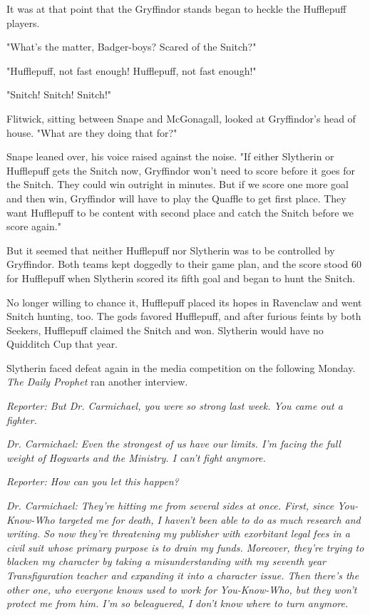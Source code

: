\documentclass[a4paper,11pt]{article}
\begin{document}
It was at that point that the Gryffindor stands began to heckle the Hufflepuff players.

"What's the matter, Badger-boys? Scared of the Snitch?"

"Hufflepuff, not fast enough! Hufflepuff, not fast enough!"

"Snitch! Snitch! Snitch!"

Flitwick, sitting between Snape and McGonagall, looked at Gryffindor's head of house. "What are they doing that for?"

Snape leaned over, his voice raised against the noise. "If either Slytherin or Hufflepuff gets the Snitch now, Gryffindor won't need to score before it goes for the Snitch. They could win outright in minutes. But if we score one more goal and then win, Gryffindor will have to play the Quaffle to get first place. They want Hufflepuff to be content with second place and catch the Snitch before we score again."

But it seemed that neither Hufflepuff nor Slytherin was to be controlled by Gryffindor. Both teams kept doggedly to their game plan, and the score stood 60 for Hufflepuff when Slytherin scored its fifth goal and began to hunt the Snitch.

No longer willing to chance it, Hufflepuff placed its hopes in Ravenclaw and went Snitch hunting, too. The gods favored Hufflepuff, and after furious feints by both Seekers, Hufflepuff claimed the Snitch and won. Slytherin would have no Quidditch Cup that year.

Slytherin faced defeat again in the media competition on the following Monday. \emph{The Daily Prophet} ran another interview.

\emph{Reporter: But Dr. Carmichael, you were so strong last week. You came out a fighter.}

\emph{Dr. Carmichael: Even the strongest of us have our limits. I'm facing the full weight of Hogwarts and the Ministry. I can't fight anymore.}

\emph{Reporter: How can you let this happen?}

\emph{Dr. Carmichael: They're hitting me from several sides at once. First, since You-Know-Who targeted me for death, I haven't been able to do as much research and writing. So now they're threatening my publisher with exorbitant legal fees in a civil suit whose primary purpose is to drain my funds. Moreover, they're trying to blacken my character by taking a misunderstanding with my seventh year Transfiguration teacher and expanding it into a character issue. Then there's the other one, who everyone knows used to work for You-Know-Who, but they won't protect me from him. I'm so beleaguered, I don't know where to turn anymore.}
\end{document}
